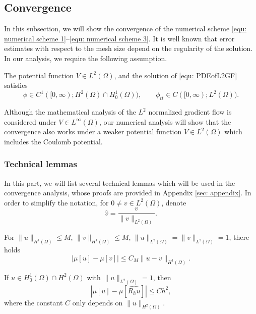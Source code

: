\documentclass{siamart250211}
\begin{document}
\subsection{Convergence}

In this subsection, we will show the convergence of the numerical scheme \eqref{equ: numerical scheme 1}--\eqref{equ: numerical scheme 3}. It is well known that error estimates with respect to the mesh size depend on the regularity of the solution. In our analysis, we require the following assumption.
\begin{amp}
	The potential function $V \in L^2(\Omega)$, and the solution of \eqref{equ: PDEofL2GF} satisfies 
	\begin{equation}
		\phi \in C^1([0,\infty); H^2(\Omega) \cap H_0^1(\Omega)), \qquad \phi_{tt}  \in C([0,\infty); L^2(\Omega) ).
	\end{equation}
\end{amp}
\begin{remark}
    Although the mathematical analysis of the $L^2$ normalized gradient flow is considered under $V \in L^{\infty}(\Omega)$, our numerical analysis will show that the convergence also works under a weaker potential function $V \in L^2(\Omega)$ which includes the Coulomb potential.
\end{remark}

\subsubsection{Technical lemmas}

In this part, we will list several technical lemmas which will be used in the convergence analysis, whose proofs are provided in Appendix \ref{sec: appendix}. In order to simplify the notation, for $0 \neq v \in L^2(\Omega)$, denote 
\begin{equation*}
	\widehat{v} = \frac{v}{\|v\|_{L^2(\Omega)}}.
\end{equation*}
	
\begin{lemma}\label{lem: technical lemma 1}
	For $\|u\|_{H^1(\Omega)} \le M$, $\|v\|_{H^1(\Omega)} \le M$, $\|u\|_{L^2(\Omega)} = \|v\|_{L^2(\Omega)} =1$, there holds
	\begin{equation*}
		|\mu[u] - \mu[v]| \le C_M \|u - v\|_{H^1(\Omega)}.
	\end{equation*}
\end{lemma}

\begin{lemma}\label{lem: technical lemma 2}
	If $u \in H_0^1(\Omega) \cap H^2(\Omega)$ with $\|u\|_{L^2(\Omega)} = 1$, then 
	\begin{equation*}
		\left| \mu[u] - \mu[\widehat{R_hu}]  \right| \le Ch^2,
	\end{equation*}
    where the constant $C$ only depends on $\|u\|_{H^2(\Omega)}$.
\end{lemma}
\end{document}
